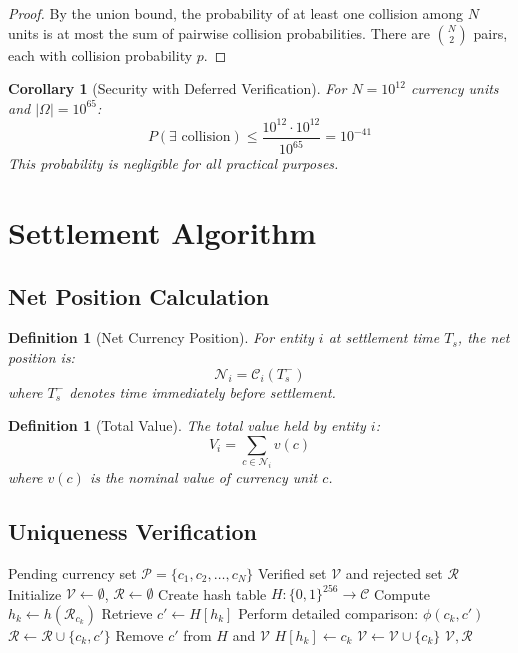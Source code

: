 \documentclass[12pt]{article}
\newtheorem{definition}[theorem]{Definition}
\newtheorem{corollary}[theorem]{Corollary}
\begin{document}
\begin{proof}
By the union bound, the probability of at least one collision among $N$ units is at most the sum of pairwise collision probabilities. There are $\binom{N}{2}$ pairs, each with collision probability $p$.
\end{proof}

\begin{corollary}[Security with Deferred Verification]
For $N = 10^{12}$ currency units and $|\Omega| = 10^{65}$:
$$
P(\exists \text{ collision}) \leq \frac{10^{12} \cdot 10^{12}}{10^{65}} = 10^{-41}
$$
This probability is negligible for all practical purposes.
\end{corollary}

\section{Settlement Algorithm}

\subsection{Net Position Calculation}

\begin{definition}[Net Currency Position]
For entity $i$ at settlement time $T_s$, the net position is:
$$
\mathcal{N}_i = \mathcal{C}_i(T_s^-)
$$
where $T_s^-$ denotes time immediately before settlement.
\end{definition}

\begin{definition}[Total Value]
The total value held by entity $i$:
$$
V_i = \sum_{c \in \mathcal{N}_i} v(c)
$$
where $v(c)$ is the nominal value of currency unit $c$.
\end{definition}

\subsection{Uniqueness Verification}

\begin{algorithm}
\caption{Batch State Uniqueness Verification}
\begin{algorithmic}[1]
\REQUIRE Pending currency set $\mathcal{P} = \{c_1, c_2, \ldots, c_N\}$
\ENSURE Verified set $\mathcal{V}$ and rejected set $\mathcal{R}$
\STATE Initialize $\mathcal{V} \leftarrow \emptyset$, $\mathcal{R} \leftarrow \emptyset$
\STATE Create hash table $H: \{0,1\}^{256} \to \mathcal{C}$
    \STATE Compute $h_k \leftarrow h(\mathcal{R}_{c_k})$
        \STATE Retrieve $c' \leftarrow H[h_k]$
        \STATE Perform detailed comparison: $\phi(c_k, c')$
         
            \STATE $\mathcal{R} \leftarrow \mathcal{R} \cup \{c_k, c'\}$
            \STATE Remove $c'$ from $H$ and $\mathcal{V}$
        \ENDIF
    \ELSE
        \STATE $H[h_k] \leftarrow c_k$
        \STATE $\mathcal{V} \leftarrow \mathcal{V} \cup \{c_k\}$
    \ENDIF
\ENDFOR
\RETURN $\mathcal{V}, \mathcal{R}$
\end{algorithmic}
\end{algorithm}
\end{document}
